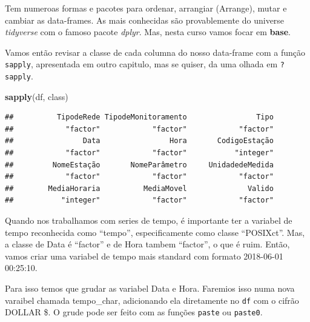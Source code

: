 \documentclass[]{book}
\newenvironment{Shaded}{\begin{snugshade}}{\end{snugshade}}
\newcommand{\KeywordTok}[1]{\textcolor[rgb]{0.13,0.29,0.53}{\textbf{#1}}}
\newcommand{\StringTok}[1]{\textcolor[rgb]{0.31,0.60,0.02}{#1}}
\newcommand{\OperatorTok}[1]{\textcolor[rgb]{0.81,0.36,0.00}{\textbf{#1}}}
\newcommand{\NormalTok}[1]{#1}
\theoremstyle{definition}
\theoremstyle{definition}
\theoremstyle{definition}
\theoremstyle{remark}
\begin{document}
Tem numeroas formas e pacotes para ordenar, arrangiar (Arrange), mutar e
cambiar as data-frames. As mais conhecidas são provablemente do universe
\emph{tidyverse} com o famoso pacote \emph{dplyr}. Mas, nesta curso
vamos focar em \textbf{base}.

Vamos então revisar a classe de cada columna do nosso data-frame com a
função \texttt{sapply}, apresentada em outro capitulo, mas se quiser, da
uma olhada em \texttt{?sapply}.

\begin{Shaded}
\begin{Highlighting}[]
\KeywordTok{sapply}\NormalTok{(df, class)}
\end{Highlighting}
\end{Shaded}

\begin{verbatim}
##          TipodeRede TipodeMonitoramento                Tipo 
##            "factor"            "factor"            "factor" 
##                Data                Hora       CodigoEstação 
##            "factor"            "factor"           "integer" 
##         NomeEstação       NomeParâmetro     UnidadedeMedida 
##            "factor"            "factor"            "factor" 
##        MediaHoraria          MediaMovel              Valido 
##           "integer"            "factor"            "factor"
\end{verbatim}

Quando nos trabalhamos com series de tempo, é importante ter a variabel
de tempo reconhecida como ``tempo'', especificamente como classe
``POSIXct''. Mas, a classe de Data é ``factor'' e de Hora tambem
``factor'', o que é ruim. Então, vamos criar uma variabel de tempo mais
standard com formato 2018-06-01 00:25:10.

Para isso temos que grudar as variabel Data e Hora. Faremios isso numa
nova varaibel chamada tempo\_char, adicionando ela diretamente no
\texttt{df} com o cifrão DOLLAR \$. O grude pode ser feito com as
funções \texttt{paste} ou \texttt{paste0}.

\begin{Shaded}
\end{Shaded}
\end{document}
